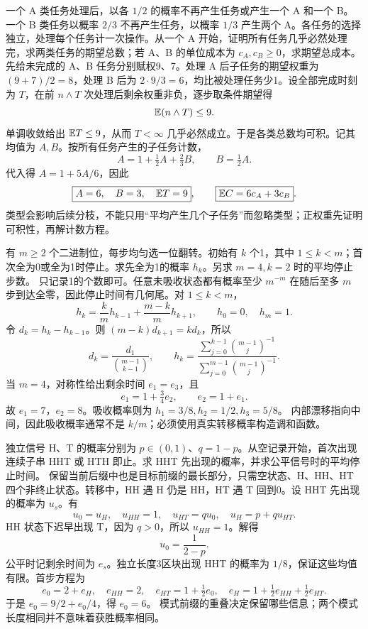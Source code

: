 一个 A 类任务处理后，以各 $1/2$ 的概率不再产生任务或产生一个 A 和一个 B。一个 B 类任务以概率 $2/3$ 不再产生任务，以概率 $1/3$ 产生两个 A。各任务的选择独立，处理每个任务计一次操作。从一个 A 开始，证明所有任务几乎必然处理完，求两类任务的期望总数；若 A、B 的单位成本为 $c_A,c_B\ge0$，求期望总成本。
\solution 先给未完成的 A、B 任务分别赋权9、7。处理 A 后子任务的期望权重为 $(9+7)/2=8$，处理 B 后为 $2\cdot9/3=6$，均比被处理任务少1。设全部完成时刻为 $T$，在前 $n\wedge T$ 次处理后剩余权重非负，逐步取条件期望得
\[
 \mathbb{E}(n\wedge T)\le9.
\]
单调收敛给出 $\mathbb{E} T\le9$，从而 $T<\infty$ 几乎必然成立。于是各类总数均可积。记其均值为 $A,B$。按所有任务产生的子任务计数，
\[
 A=1+\tfrac12A+\tfrac23B,\qquad B=\tfrac12A.
\]
代入得 $A=1+5A/6$，因此
\[
 \boxed{A=6,\quad B=3,\quad \mathbb{E} T=9},\qquad
 \boxed{\mathbb{E} C=6c_A+3c_B}.
\]
\insight 类型会影响后续分枝，不能只用“平均产生几个子任务”而忽略类型；正权重先证明可积性，再解计数方程。

有 $m\ge2$ 个二进制位，每步均匀选一位翻转。初始有 $k$ 个1，其中 $1\le k<m$；首次全为0或全为1时停止。求先全为1的概率 $h_k$。另求 $m=4,k=2$ 时的平均停止步数。
\solution 只记录1的个数即可。任意未吸收状态都有概率至少 $m^{-m}$ 在随后至多 $m$ 步到达全零，因此停止时间有几何尾。对 $1\le k<m$，
\[
 h_k=\frac{k}{m}h_{k-1}+\frac{m-k}{m}h_{k+1},
 \qquad h_0=0,\quad h_m=1.
\]
令 $d_k=h_k-h_{k-1}$。则 $(m-k)d_{k+1}=kd_k$，所以
\[
 d_k=\frac{d_1}{\binom{m-1}{k-1}},\qquad
 \boxed{h_k=\frac{\displaystyle\sum_{j=0}^{k-1}\binom{m-1}{j}^{-1}}
 {\displaystyle\sum_{j=0}^{m-1}\binom{m-1}{j}^{-1}}}.
\]
当 $m=4$，对称性给出剩余时间 $e_1=e_3$，且
\[
 e_1=1+\tfrac34e_2,\qquad e_2=1+e_1.
\]
故 $e_1=7$，$\boxed{e_2=8}$。吸收概率则为 $h_1=3/8,h_2=1/2,h_3=5/8$。
\insight 内部漂移指向中间，因此吸收概率通常不是 $k/m$；必须使用真实转移概率构造调和函数。

独立信号 H、T 的概率分别为 $p\in(0,1)$、$q=1-p$。从空记录开始，首次出现连续子串 HHT 或 HTH 即止。求 HHT 先出现的概率，并求公平信号时的平均停止时间。
\solution 保留当前后缀中也是目标前缀的最长部分，只需空状态、H、HH、HT 四个非终止状态。转移中，HH 遇 H 仍是 HH，HT 遇 T 回到0。设 HHT 先出现的概率为 $u_s$。有
\[
 u_0=u_H,\quad u_{HH}=1,\quad u_{HT}=qu_0,
 \quad u_H=p+qu_{HT}.
\]
HH 状态下迟早出现 T，因为 $q>0$，所以 $u_{HH}=1$。解得
\[
 \boxed{u_0=\frac1{2-p}}.
\]
公平时记剩余时间为 $e_s$。独立长度3区块出现 HHT 的概率为 $1/8$，保证这些均值有限。首步方程为
\[
 e_0=2+e_H,\quad e_{HH}=2,\quad
 e_{HT}=1+\tfrac12e_0,\quad
 e_H=1+\tfrac12e_{HH}+\tfrac12e_{HT}.
\]
于是 $e_0=9/2+e_0/4$，得 $\boxed{e_0=6}$。
\insight 模式前缀的重叠决定保留哪些信息；两个模式长度相同并不意味着获胜概率相同。

